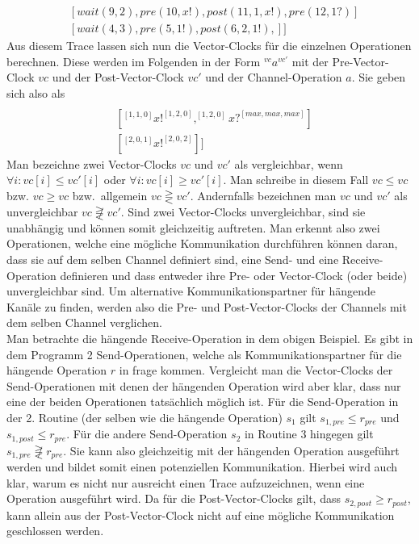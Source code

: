 \begin{align*}
  [&[signal(1, 2), signale(2, 3), pre(1, x?), post(7, 1, x?, 6), pre(8, x?), post(13, 1, x?, 11)]\\
  &[wait(9, 2), pre(10, x!), post(11, 1, x!), pre(12, 1?)]\\
  &[wait(4, 3), pre(5, 1!), post(6, 2, 1!),]
  ]
\end{align*}
Aus diesem Trace lassen sich nun die Vector-Clocks für die einzelnen Operationen berechnen.
Diese werden im Folgenden in der Form $^{vc}a^{vc'}$ mit der Pre-Vector-Clock $vc$ und der 
Post-Vector-Clock $vc'$ und der Channel-Operation $a$. Sie geben sich also als
\begin{align*}
  [&[^{[2,0,0]}x?^{[3,0,2]}, ^{[3,0,2]}x?^{[4,2,2]}]\\
  &[^{[1, 1, 0]}x!^{[1, 2, 0]}, ^{[1, 2, 0]}x?^{[max, max, max]}]\\
  &[^{[2, 0, 1]}x!^{[2, 0, 2]}]]
\end{align*}
Man bezeichne zwei Vector-Clocks $vc$ und $vc'$ als vergleichbar, wenn
$\forall i: vc[i] \leq vc'[i]$ oder $\forall i: vc[i] \geq vc'[i]$. Man 
schreibe in diesem Fall $vc \leq vc$ bzw. $vc \geq vc$ bzw.~allgemein 
$vc \gtreqless vc'$. Andernfalls 
bezeichnen man $vc$ und $vc'$ als unvergleichbar $vc \not\gtreqless vc'$. 
Sind zwei Vector-Clocks 
unvergleichbar, sind sie unabhängig und können somit gleichzeitig auftreten. 
Man erkennt also zwei Operationen, welche eine mögliche Kommunikation durchführen 
können daran, dass sie auf dem selben Channel definiert sind, eine Send-
und eine Receive-Operation definieren und dass 
entweder ihre Pre- oder Vector-Clock (oder beide) unvergleichbar sind.
Um alternative Kommunikationspartner für hängende Kanäle zu finden, werden also
die Pre- und Post-Vector-Clocks der Channels mit dem selben Channel verglichen.\\
Man betrachte die hängende Receive-Operation in dem obigen Beispiel. Es gibt 
in dem Programm 2 Send-Operationen, welche als Kommunikationspartner für 
die hängende Operation $r$ in frage kommen. Vergleicht man die Vector-Clocks der 
Send-Operationen mit denen der hängenden Operation wird aber klar, dass nur 
eine der beiden Operationen tatsächlich möglich ist. Für die Send-Operation 
in der 2. Routine (der selben wie die hängende Operation) $s_1$ gilt 
$s_{1, pre} \leq r_{pre}$ und $s_{1, post} \leq r_{pre}$.  
Für die andere Send-Operation $s_2$ in Routine 3 hingegen gilt 
$s_{1, pre} \not\gtreqless r_{pre}$. Sie kann also gleichzeitig mit der 
hängenden Operation ausgeführt werden und bildet somit einen potenziellen 
Kommunikation. Hierbei wird auch klar, warum es nicht nur ausreicht einen 
Trace aufzuzeichnen, wenn eine Operation ausgeführt wird. Da für die 
Post-Vector-Clocks gilt, dass $s_{2, post} \geq r_{post}$, kann allein aus der 
Post-Vector-Clock nicht auf eine mögliche Kommunikation geschlossen werden.

